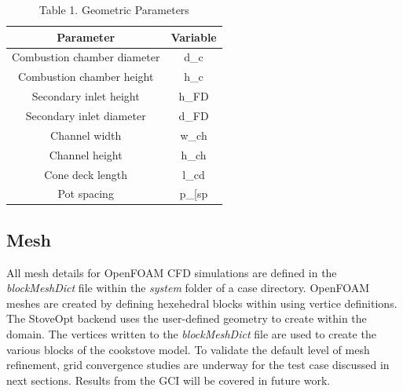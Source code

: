 \documentclass[3p,times,twocolumn]{elsarticle}
\begin{document}
\begin{table}{\linewidth}
	\centering
	\begin{tabular}{||c c||} 
		  \hline
		   Parameter & Variable \\ [0.4ex] 
		    \hline\hline
		     Combustion chamber diameter & d_{c} \\ 
		     Combustion chamber height & h_{c} \\
		     Secondary inlet height & h_{FD} \\
		     Secondary inlet diameter & d_{FD} \\
		     Channel width & w_{ch} \\ [1ex] 
	             Channel height & h_{ch} \\ [1ex]
		     Cone deck length & l_{cd} \\ [1ex]
	             Pot spacing & p_[sp} \\ [1ex]
		     \hline
		     \end{tabular}
		     \caption{Table 1. Geometric Parameters}
	   
\end{table}


\subsection{Mesh}
All mesh details for OpenFOAM CFD simulations are defined in the \textit{blockMeshDict} file within the \textit{system} folder of a case directory. OpenFOAM meshes are created by defining hexehedral blocks within using vertice definitions. The StoveOpt backend uses the user-defined geometry to create within the domain. The vertices written to the \textit{blockMeshDict} file are used to create the various blocks of the cookstove model. To validate the default level of mesh refinement, grid convergence studies are underway for the test case discussed in next sections. Results from the GCI will be covered in future work. 
\end{document}
